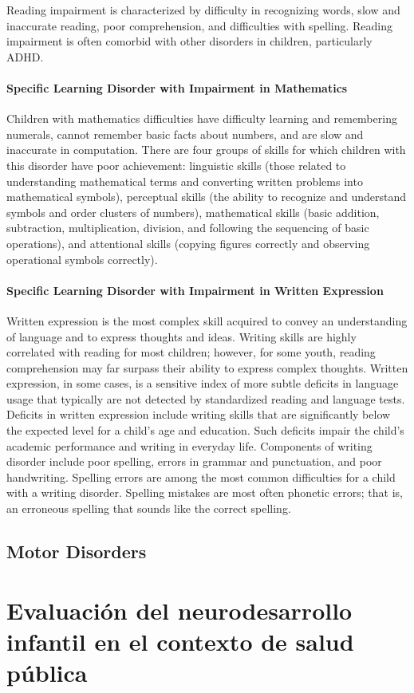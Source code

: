 Reading impairment is characterized by difficulty in recognizing words, slow
and inaccurate reading, poor comprehension, and difficulties with spelling.
Reading impairment is often comorbid with other disorders in children,
particularly ADHD. \cite{Boland2021-by}

\paragraph{Specific Learning Disorder with Impairment in Mathematics}
Children with mathematics difficulties have difficulty learning and remembering numerals, cannot remember basic facts about numbers, and are slow and inaccurate in computation. There are four groups of skills for which children with this disorder have poor achievement: linguistic skills (those related to understanding mathematical terms and converting written problems into mathematical symbols), perceptual skills (the ability to recognize and understand symbols and order clusters of numbers), mathematical skills (basic addition, subtraction, multiplication, division, and following the sequencing of basic operations), and attentional skills (copying figures correctly and observing operational symbols correctly). \cite{Boland2021-by}

\paragraph{Specific Learning Disorder with Impairment in Written Expression}
Written expression is the most complex skill acquired to convey an understanding of language and to express thoughts and ideas. Writing skills are highly correlated with reading for most children; however, for some youth, reading comprehension may far surpass their ability to express complex thoughts. Written expression, in some cases, is a sensitive index of more subtle deficits in language usage that typically are not detected by standardized reading and language tests.
Deficits in written expression include writing skills that are significantly below the expected level for a child’s age and education. Such deficits impair the child’s academic performance and writing in everyday life. Components of writing disorder include poor spelling, errors in grammar and punctuation, and poor handwriting. Spelling errors are among the most common difficulties for a child with a writing disorder. Spelling mistakes are most often phonetic errors; that is, an erroneous spelling that sounds like the correct spelling. \cite{Boland2021-by}

\subsection{Motor Disorders}


\section{Evaluación del neurodesarrollo infantil en el contexto de salud pública}


